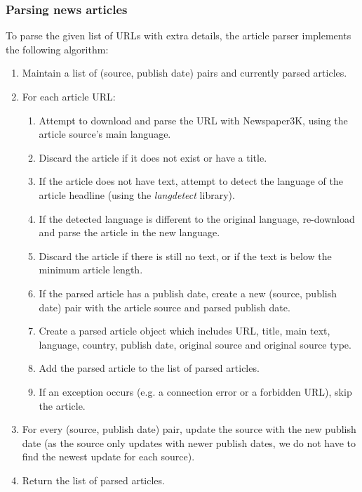 \documentclass{l4proj}
\begin{document}
\subsubsection{Parsing news articles} \hfill \par
To parse the given list of URLs with extra details, the article parser implements the following algorithm:
\begin{enumerate}
    \item Maintain a list of (source, publish date) pairs and currently parsed articles.
    \item For each article URL:
    \begin{enumerate}
        \item Attempt to download and parse the URL with Newspaper3K, using the article source's main language.
        \item Discard the article if it does not exist or have a title.
        \item If the article does not have text, attempt to detect the language of the article headline (using the \emph{langdetect} library).
        \item If the detected language is different to the original language, re-download and parse the article in the new language.
        \item Discard the article if there is still no text, or if the text is below the minimum article length.
        \item If the parsed article has a publish date, create a new (source, publish date) pair with the article source and parsed publish date.
        \item Create a parsed article object which includes URL, title, main text, language, country, publish date, original source and original source type.
        \item Add the parsed article to the list of parsed articles.
        \item If an exception occurs (e.g. a connection error or a forbidden URL), skip the article.
    \end{enumerate}
    \item For every (source, publish date) pair, update the source with the new publish date (as the source only updates with newer publish dates, we do not have to find the newest update for each source).
    \item Return the list of parsed articles.
\end{enumerate}
\end{document}
